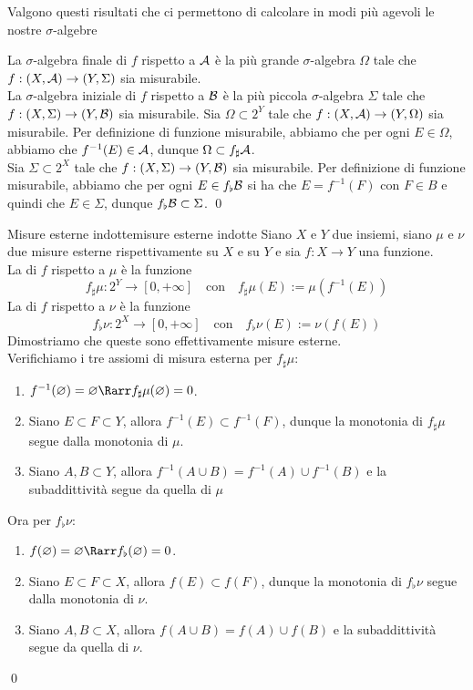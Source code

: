 \documentclass{article}
\renewcommand\A{\mc{A}}
\begin{document}
Valgono questi risultati che ci permettono di calcolare in modi più agevoli le nostre $\sigma$-algebre

\begin{proposition}{}{}
    La $\sigma$-algebra finale di $f$ rispetto a $\A$ è la più grande $\sigma$-algebra $\Omega$ tale che $f : (X,\A)\to (Y,\Sigma)$ sia misurabile.\\
    La $\sigma$-algebra iniziale di $f$ rispetto a $\mathcal{B}$ è la più piccola $\sigma$-algebra $\Sigma$ tale che $f : (X,\Sigma)\to (Y,\mathcal{B})$ sia misurabile.
    \proof
    Sia $\Omega \subset 2^Y$ tale che $f : (X,\A)\to (Y,\Omega)$ sia misurabile. Per definizione di funzione misurabile, abbiamo che per ogni $E \in \Omega$, abbiamo che $f^{-1}(E)\in \A$, dunque $\Omega\subset f_\sharp\A$.\\
    Sia $\Sigma \subset 2^X$ tale che $f : (X,\Sigma)\to (Y,\mathcal{B})$ sia misurabile. Per definizione di funzione misurabile, abbiamo che per ogni $E \in f_\flat\mathcal{B}$ si ha che $E = f^{-1}(F)$ con $F \in B$ e quindi che $E \in \Sigma$, dunque $f_\flat\mathcal{B}\subset \Sigma$.
    \qed
\end{proposition}

\begin{definition}{Misure esterne indotte}{misure esterne indotte}
    Siano $X$ e $Y$ due insiemi, siano $\mu$ e $\nu$ due misure esterne rispettivamente su $X$ e su $Y$ e sia $f:X\to Y$ una funzione.\\
    La  di $f$ rispetto a $\mu$ è la funzione
    \[f_\sharp\mu : 2^Y \to [0,+\infty] \quad \text{con} \quad f_\sharp\mu(E):= \mu(f^{-1}(E)) \]
    La  di $f$ rispetto a $\nu$ è la funzione
    \[f_\flat\nu : 2^X \to [0,+\infty] \quad \text{con} \quad f_\flat\nu(E) := \nu(f(E))\]
    \proof 
    Dimostriamo che queste sono effettivamente misure esterne.\\
    Verifichiamo i tre assiomi di misura esterna per $f_\sharp\mu$:\begin{enumerate}
        \item $f^{-1}(\varnothing) = \varnothing \Rarr f_\sharp\mu(\varnothing) = 0$.
        \item Siano $E \subset F \subset Y$, allora $f^{-1}(E)\subset f^{-1}(F)$, dunque la monotonia di $f_\sharp\mu$ segue dalla monotonia di $\mu$.
        \item Siano $A,B \subset Y$, allora $f^{-1}(A\cup B)= f^{-1}(A) \cup f^{-1}(B)$ e la subaddittività segue da quella di $\mu$
    \end{enumerate}
    Ora per $f_\flat\nu$:\begin{enumerate}
        \item $f(\varnothing) = \varnothing \Rarr f_\flat(\varnothing) = 0$.
        \item Siano $E \subset F \subset X$, allora $f(E)\subset f(F)$, dunque la monotonia di $f_\flat\nu$ segue dalla monotonia di $\nu$.
        \item Siano $A,B \subset X$, allora $f(A \cup B) = f(A)\cup f(B)$ e la subaddittività segue da quella di $\nu$.
    \end{enumerate}
    \qed
\end{definition}
\end{document}
